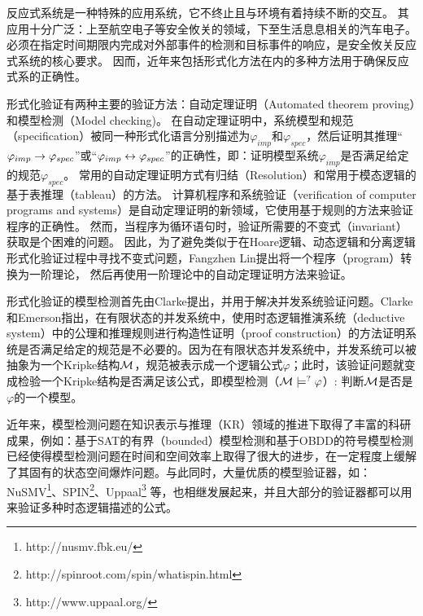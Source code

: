 反应式系统是一种特殊的应用系统，它不终止且与环境有着持续不断的交互。
其应用十分广泛：上至航空电子等安全攸关的领域，下至生活息息相关的汽车电子。
必须在指定时间期限内完成对外部事件的检测和目标事件的响应，是安全攸关反应式系统的核心要求。
因而，近年来包括形式化方法在内的多种方法用于确保反应式系的正确性。


形式化验证有两种主要的验证方法：自动定理证明（Automated theorem proving）和模型检测（Model checking)。
在自动定理证明中，系统模型和规范（specification）被同一种形式化语言分别描述为$\varphi_{imp}$和$\varphi_{spec}$，然后证明其推理“$\varphi_{imp}\rightarrow \varphi_{spec}$”或“$\varphi_{imp}\leftrightarrow\varphi_{spec}$”的正确性，即：证明模型系统$\varphi_{imp}$是否满足给定的规范$\varphi_{spec}$。
常用的自动定理证明方式有归结（Resolution）\cite{DBLP:journals/jacm/Robinson65}和常用于模态逻辑的基于表推理（tableau）\cite{hughes1996new}的方法。
计算机程序和系统验证（verification of computer programs and systems）是自动定理证明的新领域，它使用基于规则的方法来验证程序的正确性。
然而，当程序为循环语句时，验证所需要的不变式（invariant）获取是个困难的问题。
因此，为了避免类似于在Hoare逻辑\cite{Hoare1969}、动态逻辑\cite{harel1979first}和分离逻辑\cite{DBLP:conf/lics/Reynolds02}形式化验证过程中寻找不变式问题，Fangzhen Lin提出将一个程序（program）转换为一阶理论，
然后再使用一阶理论中的自动定理证明方法来验证\cite{DBLP:journals/ai/Lin16}。

形式化验证的模型检测首先由Clarke提出，并用于解决并发系统验证问题\cite{DBLP:conf/spin/Clarke08}。Clarke和Emerson指出，在有限状态的并发系统中，使用时态逻辑推演系统（deductive system）中的公理和推理规则进行构造性证明（proof construction）的方法证明系统是否满足给定的规范是不必要的\cite{clarke1981design}。因为在有限状态并发系统中，并发系统可以被抽象为一个Kripke结构${\cal M}$，规范被表示成一个逻辑公式$\varphi$；此时，该验证问题就变成检验一个Kripke结构是否满足该公式，即模型检测（${\cal M}\models^? \varphi$）: 判断${\cal M}$是否是$\varphi$的一个模型。

近年来，模型检测问题在知识表示与推理（KR）领域的推进下取得了丰富的科研成果，例如：基于SAT的有界（bounded）模型检测\cite{DBLP:journals/ac/BiereCCSZ03}和基于OBDD的符号模型检测\cite{burch1992symbolic}已经使得模型检测问题在时间和空间效率上取得了很大的进步，在一定程度上缓解了其固有的状态空间爆炸问题。与此同时，大量优质的模型验证器，如：NuSMV\footnote{http://nusmv.fbk.eu/}、SPIN\footnote{http://spinroot.com/spin/whatispin.html}、Uppaal\footnote{http://www.uppaal.org/} 等，也相继发展起来，并且大部分的验证器都可以用来验证多种时态逻辑描述的公式。  

